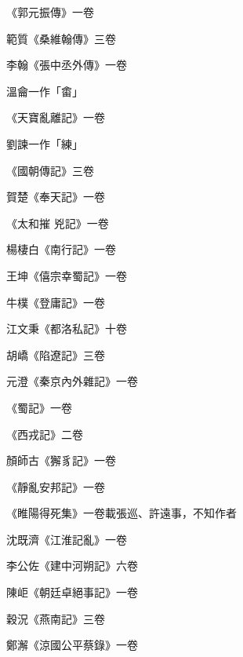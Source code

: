 \begin{pinyinscope}
 《郭元振傳》一卷



 範質《桑維翰傳》三卷



 李翰《張中丞外傳》一卷



 溫龠一作「畬」



 《天寶亂離記》一卷



 劉諫一作「練」



 《國朝傳記》三卷



 賀楚《奉天記》一卷



 《太和摧
 兇記》一卷



 楊棲白《南行記》一卷



 王坤《僖宗幸蜀記》一卷



 牛樸《登庸記》一卷



 江文秉《都洛私記》十卷



 胡嶠《陷遼記》三卷



 元澄《秦京內外雜記》一卷



 《蜀記》一卷



 《西戎記》二卷



 顏師古《獬豸記》一卷



 《靜亂安邦記》一卷



 《睢陽得死集》一卷載張巡、許遠事，不知作者



 沈既濟《江淮記亂》一卷



 李公佐《建中河朔記》六卷



 陳岠《朝廷卓絕事記》一卷



 穀況《燕南記》三卷



 鄭澥《涼國公平蔡錄》一卷




\end{pinyinscope}
